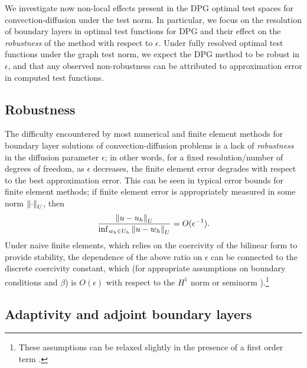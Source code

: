 We investigate now non-local effects present in the DPG optimal test spaces for convection-diffusion under the test norm.  In particular, we focus on the resolution of boundary layers in optimal test functions for DPG and their effect on the \textit{robustness} of the method with respect to $\epsilon$. Under fully resolved optimal test functions under the graph test norm, we expect the DPG method to be robust in $\epsilon$, and that any observed non-robustness can be attributed to approximation error in computed test functions.  

\subsection{Robustness}
\label{sec:robust}
The difficulty encountered by most numerical and finite element methods for boundary layer solutions of convection-diffusion problems is a lack of \textit{robustness} in the diffusion parameter $\epsilon$; in other words, for a fixed resolution/number of degrees of freedom, as $\epsilon$ decreases, the finite element error degrades with respect to the best approximation error.  This can be seen in typical error bounds for finite element methods; if finite element error is appropriately measured in some norm $\nor{\cdot}_U$, then
\[
\frac{\nor{u-u_h}_U}{\inf_{w_h\in U_h}\nor{u-w_h}_U} = O(\epsilon^{-1}).
\]
Under naive finite elements, which relies on the coercivity of the bilinear form to provide stability, the dependence of the above ratio on $\epsilon$ can be connected to the discrete coercivity constant, which (for appropriate assumptions on boundary conditions and $\beta$) is $O(\epsilon)$ with respect to the $H^1$ norm or seminorm \cite{roos2008robust}).\footnote{These assumptions can be relaxed slightly in the presence of a first order term \cite{stynesSUPG}.}

\subsection{Adaptivity and adjoint boundary layers}

